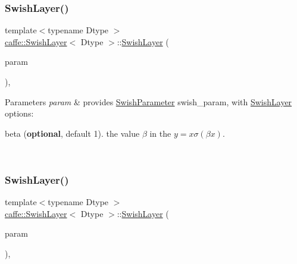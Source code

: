 \subsubsection{\texorpdfstring{Swish\+Layer()}{SwishLayer()}\hspace{0.1cm}{\footnotesize\ttfamily [1/2]}}
{\footnotesize\ttfamily template$<$typename Dtype $>$ \\
\mbox{\hyperlink{classcaffe_1_1_swish_layer}{caffe\+::\+Swish\+Layer}}$<$ Dtype $>$\+::\mbox{\hyperlink{classcaffe_1_1_swish_layer}{Swish\+Layer}} (\begin{DoxyParamCaption}\item[{const \mbox{\hyperlink{classcaffe_1_1_layer_parameter}{Layer\+Parameter}} \&}]{param }\end{DoxyParamCaption})\hspace{0.3cm}{\ttfamily [inline]}, {\ttfamily [explicit]}}


\begin{DoxyParams}{Parameters}
{\em param} & provides \mbox{\hyperlink{classcaffe_1_1_swish_parameter}{Swish\+Parameter}} swish\+\_\+param, with \mbox{\hyperlink{classcaffe_1_1_swish_layer}{Swish\+Layer}} options\+:
\begin{DoxyItemize}
\item beta ({\bfseries optional}, default 1). the value $ \beta $ in the $ y = x \sigma (\beta x) $. 
\end{DoxyItemize}\\
\hline
\end{DoxyParams}
\mbox{\label{classcaffe_1_1_swish_layer_afd59cd91314ef60acef0d3ba80500818}} 
\subsubsection{\texorpdfstring{Swish\+Layer()}{SwishLayer()}\hspace{0.1cm}{\footnotesize\ttfamily [2/2]}}
{\footnotesize\ttfamily template$<$typename Dtype $>$ \\
\mbox{\hyperlink{classcaffe_1_1_swish_layer}{caffe\+::\+Swish\+Layer}}$<$ Dtype $>$\+::\mbox{\hyperlink{classcaffe_1_1_swish_layer}{Swish\+Layer}} (\begin{DoxyParamCaption}\item[{const \mbox{\hyperlink{classcaffe_1_1_layer_parameter}{Layer\+Parameter}} \&}]{param }\end{DoxyParamCaption})\hspace{0.3cm}{\ttfamily [inline]}, {\ttfamily [explicit]}}


